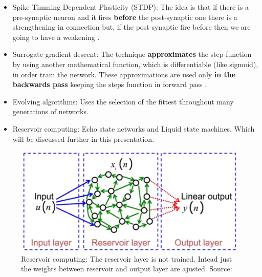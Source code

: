 \begin{frame}[allowframebreaks]
	\begin{itemize}
		\item Spike Timming Dependent Plasticity (STDP): The idea is that if there is a pre-synaptic neuron and it fires \textbf{before} the post-synaptic one there is a strengthening in connection but, if the post-synaptic fire before then we are going to have a weakening .
		\item Surrogate gradient descent: The technique \textbf{approximates} the step-function by using another mathematical function, which is differentiable (like sigmoid), in order train the network. These approximations are used only \textbf{in the backwards pass} keeping the steps function in forward pass \cite{kasabov2019time}.
		\item Evolving algorithms: Uses the selection of the fittest throughout many generations of networks.
		\item Reservoir computing: Echo state networks and Liquid state machines. Which will be discussed further in this presentation.
	\end{itemize} 		
	
	\begin{figure}
		\centering
		\includegraphics[width=0.7\linewidth]{images/reservoirComputing}
		\caption[Reservoir computing]{Reservoir computing: The reservoir layer is not trained. Intead just the weights between reservoir and output layer are ajusted. Source: \cite{kasabov2019time}}
		\label{fig:reservoircomputing}
	\end{figure}
	



\end{frame}
